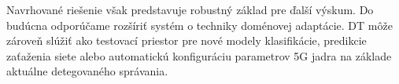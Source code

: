 \documentclass[a4paper,10pt]{ieeetran}
\begin{document}
Navrhované riešenie však predstavuje robustný základ pre ďalší výskum. Do budúcna odporúčame rozšíriť systém o techniky doménovej adaptácie. DT môže zároveň slúžiť ako testovací priestor pre nové modely klasifikácie, predikcie zaťaženia siete alebo automatickú konfiguráciu parametrov 5G jadra na základe aktuálne detegovaného správania.


%

\end{document}
